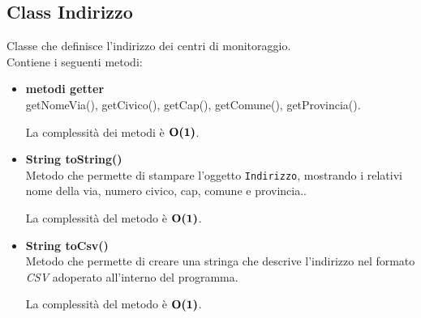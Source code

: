 \documentclass[a4paper, 12pt]{scrreprt}
\begin{document}
			\subsection{Class Indirizzo}
			Classe che definisce l'indirizzo dei centri di monitoraggio.
			\\Contiene i seguenti metodi:\\
			\begin{itemize}
				\item \textbf{metodi getter}
				\\ getNomeVia(), getCivico(), getCap(), getComune(), getProvincia().
				
				La complessit\`a dei metodi \`e $\mathbf{O}\textbf{(1)}$.
				
				\item \textbf{String toString()}
				\\Metodo che permette di stampare l'oggetto \verb!Indirizzo!, mostrando i relativi nome della via, numero civico, cap, comune e provincia..
				
				La complessit\`a del metodo \`e $\mathbf{O}\textbf{(1)}$.
				
				\item \textbf{String toCsv()}
				\\Metodo che permette di creare una stringa che descrive l'indirizzo nel formato \textsl{CSV} adoperato all'interno del programma.
				
				La complessit\`a del metodo \`e $\mathbf{O}\textbf{(1)}$.
				
			\end{itemize}
\pagebreak
\end{document}
